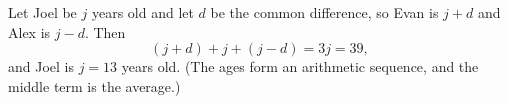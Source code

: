 Let Joel be $j$ years old and let $d$ be the common difference, so Evan is $j+d$ and Alex is $j-d$. Then
\[
(j+d)+j+(j-d)=3j=39,
\]
and Joel is $j=\boxed{13}$ years old. (The ages form an arithmetic sequence, and the middle term is the average.)

